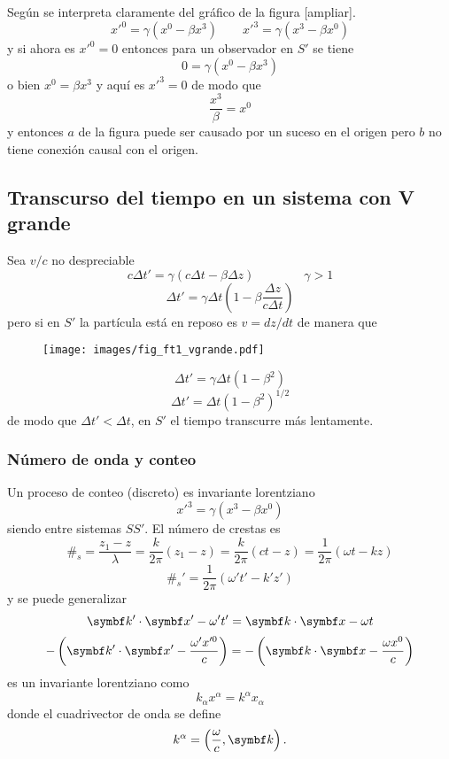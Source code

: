 \documentclass[10pt,oneside]{CBFT_book}
\begin{document}
Según se interpreta claramente del gráfico de la figura [ampliar].
\[
	x'^0 = \gamma (x^0 - \beta x^3) \qquad x'^3 = \gamma (x^3 - \beta x^0)
\]
y si ahora es $x'^0 = 0$ entonces para un observador en $S'$ se tiene 
\[
	0 = \gamma (x^0 - \beta x^3) 
\]
o bien $x^0 = \beta x^3$ y aquí es $x'^3 = 0$ de modo que 
\[
	\frac{x^3}{\beta} = x^0
\]
y entonces $a$ de la figura puede ser causado por un suceso en el origen pero $b$ no tiene 
conexión causal con el origen.

\subsection{Transcurso del tiempo en un sistema con V grande}

Sea $v/c$ no despreciable 
\[
	c \Delta t' = \gamma ( c\Delta t - \beta \Delta z) \qquad \qquad \gamma >1
\]
\[
	\Delta t' = \gamma \Delta t \left( 1 - \beta \frac{\Delta z}{c\Delta t} \right)
\]
pero si en $S'$ la partícula está en reposo es $v = dz/dt $ de manera que 
\begin{figure}[htb]
	\begin{center}
	\texttt{[image: images/fig\_ft1\_vgrande.pdf]}	 
	\end{center}
	\caption{}
\end{figure} 
\[
	\Delta t' = \gamma \Delta t ( 1 - \beta^2)
\]
\[
	\Delta t' = \Delta t ( 1 - \beta^2)^{1/2}
\]
de modo que $ \Delta t' < \Delta t$, en $S'$ el tiempo transcurre más lentamente.

\subsubsection{Número de onda y conteo}

Un proceso de conteo (discreto) es invariante lorentziano
\[
	x'^3 = \gamma ( x^3 - \beta x^0 )
\]
siendo  entre sistemas $SS'$.
El número de crestas es 
\[
	\#_s = \frac{ z_1 - z }{ \lambda } = \frac{ k }{ 2\pi }( z_1 - z ) = \frac{ k }{ 2\pi }( ct - z ) = 
	\frac{ 1 }{ 2\pi }( \omega t - kz )
\]
\[
	\#_s' = \frac{ 1 }{ 2\pi }( \omega' t' - k'z' )
\]
y se puede generalizar
\[
	\pe{k'}{x'} - \omega' t' = \pe{k}{x} - \omega t
\]
\[
	-\left( \pe{k'}{x'} - \frac{\omega' x'^0 }{c} \right) = -\left( \pe{k}{x} - \frac{\omega x^0 }{c}  
\right)
\]
es un invariante lorentziano como
\[
	k_\alpha x^\alpha = k^\alpha x_\alpha
\]
donde el cuadrivector de onda se define
\[
	k^\alpha = \left( \frac{\omega}{c}, \vb{k}\right).
\]

\end{document}
